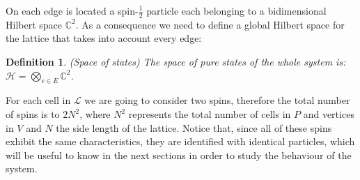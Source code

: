\documentclass{Configuration_Files/PoliMi3i_thesis}
\newtheorem{definition}{Definition}[chapter]
\begin{document}
On each edge is located a spin-$\frac{1}{2}$ particle each belonging to a bidimensional Hilbert space $\mathbb{C}^2$. As a consequence we need to define a global Hilbert space for the lattice that takes into account every edge:

\begin{definition}(Space of states)
	The space of pure states of the whole system is: $\mathscr{H}= \bigotimes_{e \in E} \mathbb{C}^2$.
\end{definition}

For each cell in $\mathcal{L}$ we are going to consider two spins, therefore the total number of spins is to $2N^2$, where $N^2$ represents the total number of cells in $P$ and vertices in $V$ and $N$ the side length of the lattice. \newline
Notice that, since all of these spins exhibit the same characteristics, they are identified with identical particles, which will be useful to know in the next sections in order to study the behaviour of the system.
\end{document}
